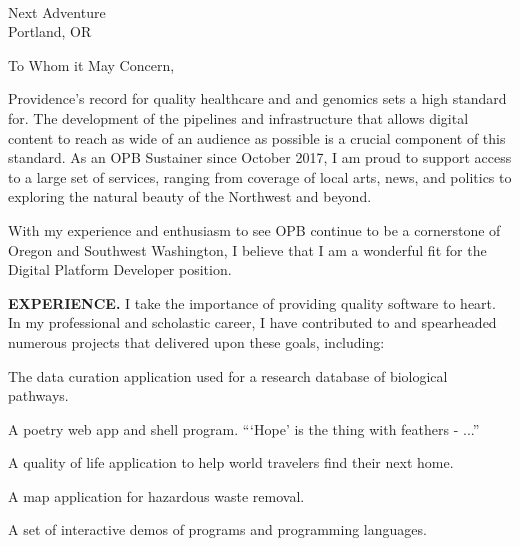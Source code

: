 



\textcolor{my-grey}{\dotfill}
\bigbreak

{\DTMtoday}\\
Next Adventure\\
Portland, OR

\vspace*{2\baselineskip}

To Whom it May Concern,

\vspace*{2\baselineskip}

Providence's record for quality healthcare and and genomics sets a high standard for. The development of the pipelines and infrastructure that allows digital content to reach as wide of an audience as possible is a crucial component of this standard. As an OPB Sustainer since October 2017, I am proud to support access to a large set of services, ranging from coverage of local arts, news, and politics to exploring the natural beauty of the Northwest and beyond.

\vspace*{\baselineskip}

With my experience and enthusiasm to see OPB continue to be a cornerstone of Oregon and Southwest Washington, I believe that I am a wonderful fit for the Digital Platform Developer position.

\vspace*{\baselineskip}

\textbf{EXPERIENCE.} I take the importance of providing quality software to heart. In my professional and scholastic career, I have contributed to and spearheaded numerous projects that delivered upon these goals, including:

\begin{itemize}[label=$\triangleright$]
The data curation application used for a research database of biological pathways.

A poetry web app and shell program. ```Hope' is the thing with feathers - ...''

A quality of life application to help world travelers find their next home.

A map application for hazardous waste removal.

A set of interactive demos of programs and programming languages.

\end{itemize}

